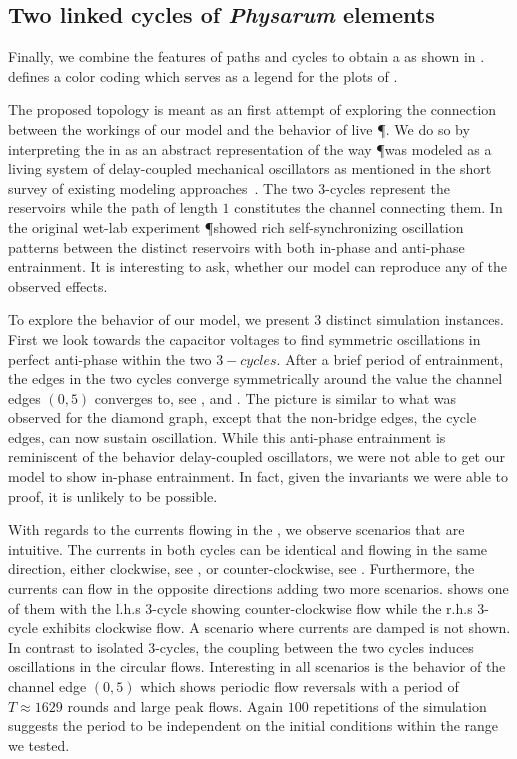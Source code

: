 	\subsection{Two linked cycles of \emph{Physarum} elements}

		Finally, we combine the features of paths and cycles to obtain a \Pns as shown in .  defines a color coding which serves as a legend for the plots of .

		The proposed topology is meant as an first attempt of exploring the connection between the workings of our model and the behavior of live \P. We do so by interpreting the \Pn in  as an abstract representation of the way \P was modeled as a living system of delay-coupled mechanical oscillators as mentioned in the short survey of existing modeling approaches~\cite{PhysRevLett.85.2026}. The two $3$-cycles represent the reservoirs while the path of length $1$ constitutes the channel connecting them. In the original wet-lab experiment \P showed rich self-synchronizing oscillation patterns between the distinct reservoirs with both in-phase and anti-phase entrainment. It is interesting to ask, whether our model can reproduce any of the observed effects.

		To explore the behavior of our model, we present $3$ distinct simulation instances. First we look towards the capacitor voltages to find symmetric oscillations in perfect anti-phase within the two $3-cycles$. After a brief period of entrainment, the edges in the two cycles converge symmetrically around the value the channel edges $(0,5)$ converges to, see ,  and . The picture is similar to what was observed for the diamond graph, except that the non-bridge edges, \ie the cycle edges, can now sustain oscillation. While this anti-phase entrainment is reminiscent of the behavior delay-coupled oscillators, we were not able to get our model to show in-phase entrainment. In fact, given the invariants we were able to proof, it is unlikely to be possible.

		With regards to the currents flowing in the \Pn, we observe scenarios that are intuitive. The currents in both cycles can be identical and flowing in the same direction, either clockwise, see , or counter-clockwise, see . Furthermore, the currents can flow in the opposite directions adding two more scenarios.  shows one of them with the l.h.s $3$-cycle showing counter-clockwise flow while the r.h.s $3$-cycle exhibits clockwise flow. A scenario where currents are damped is not shown. In contrast to isolated $3$-cycles, the coupling between the two cycles induces oscillations in the circular flows.	Interesting in all scenarios is the behavior of the channel edge $(0,5)$ which shows periodic flow reversals with a period of $T \approx 1629 $ rounds and large peak flows. Again $100$ repetitions of the simulation suggests the period to be independent on the initial conditions within the range we tested.

